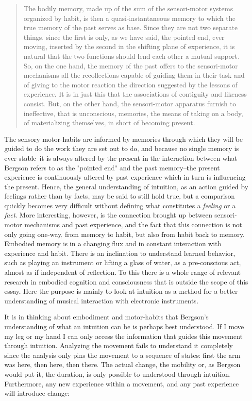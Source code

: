 \documentclass[11pt]{article}
\begin{document}
\begin{quote}
The bodily memory, made up of the sum of the sensori-motor systems organized by habit, is then a quasi-instantaneous memory to which the true memory of the past serves as base. Since they are not two separate things, since the first is only, as we have said, the pointed end, ever moving, inserted by the second in the shifting plane of experience, it is natural that the two functions should lend each other a mutual support. So, on the one hand, the memory of the past offers to the sensori-motor mechanisms all the recollections capable of guiding them in their task and of giving to the motor reaction the direction suggested by the lessons of experience. It is in just this that the associations of contiguity and likeness consist. But, on the other hand, the sensori-motor apparatus furnish to ineffective, that is unconscious, memories, the means of taking on a body, of materializing themselves, in short of becoming present. \citep[p. 152-3]{bergson91}
\end{quote}

The sensory motor-habits are informed by memories through which they will be guided to do the work they are set out to do, and because no single memory is ever stable--it is always altered by the present in the interaction between what Bergson refers to as the "pointed end" and the past memory--the present experience is continuously altered by past experience which in turn is influencing the present. Hence, the general understanding of intuition, as an action guided by feelings rather than by facts, may be said to still hold true, but a comparison quickly becomes very difficult without defining what constitutes a \emph{feeling} or a \emph{fact}. More interesting, however, is the connection brought up between sensori-motor mechanisms and past experience, and the fact that this connection is not only going one-way, from memory to habit, but also from habit back to memory. Embodied memory is in a changing flux and in constant interaction with experience and habit. There is an inclination to understand learned behavior, such as playing an instrument or lifting a glass of water, as a pre-conscious act, almost as if independent of reflection. To this there is a whole range of relevant research in embodied cognition and consciousness that is outside the scope of this essay. Here the purpose is mainly to look at intuition as a method for a better understanding of musical interaction with electronic instruments.

It is in thinking about embodiment and motor-habits that Bergson's understanding of what an intuition can be is perhaps best understood. If I move my leg or my hand I can only access the information that guides this movement through intuition. Analyzing the movement fails to understand it completely since the analysis only pins the movement to a sequence of states: first the arm was here, then here, then there. The actual change, the mobility or, as Bergson would put it, the duration, is only possible to understood through intuition. Furthermore, any new experience within a movement, and any past experience will introduce change:
\end{document}
